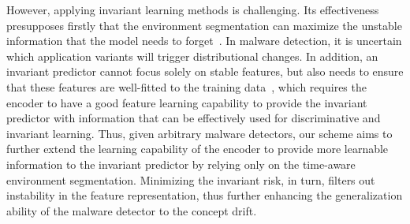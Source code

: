 However, applying invariant learning methods is challenging. Its effectiveness presupposes firstly that the environment segmentation can maximize the unstable information that the model needs to forget~\cite{environment_label, env_label}. In malware detection, it is uncertain which application variants will trigger distributional changes. In addition, an invariant predictor cannot focus solely on stable features, but also needs to ensure that these features are well-fitted to the training data~\cite{yang2024invariant}, which requires the encoder to have a good feature learning capability to provide the invariant predictor with information that can be effectively used for discriminative and invariant learning. Thus, given arbitrary malware detectors, our scheme aims to further extend the learning capability of the encoder to provide more learnable information to the invariant predictor by relying only on the time-aware environment segmentation. Minimizing the invariant risk, in turn, filters out instability in the feature representation, thus further enhancing the generalization ability of the malware detector to the concept drift.


